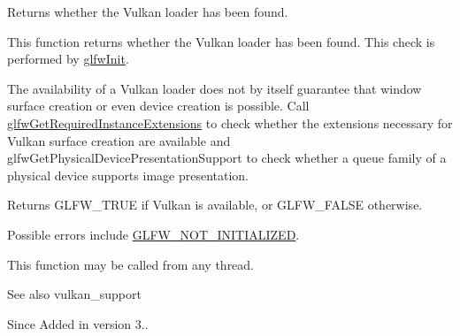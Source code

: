 Returns whether the Vulkan loader has been found. 

This function returns whether the Vulkan loader has been found. This check is performed by \hyperlink{group__init_gab41771f0215a2e0afb4cf1cf98082d40}{glfw\+Init}.

The availability of a Vulkan loader does not by itself guarantee that window surface creation or even device creation is possible. Call \hyperlink{group__vulkan_gada152edc5bbbd0c2138728878632fd9c}{glfw\+Get\+Required\+Instance\+Extensions} to check whether the extensions necessary for Vulkan surface creation are available and glfw\+Get\+Physical\+Device\+Presentation\+Support to check whether a queue family of a physical device supports image presentation.

\begin{DoxyReturn}{Returns}
{\ttfamily G\+L\+F\+W\+\_\+\+T\+R\+UE} if Vulkan is available, or {\ttfamily G\+L\+F\+W\+\_\+\+F\+A\+L\+SE} otherwise.
\end{DoxyReturn}
Possible errors include \hyperlink{group__errors_ga2374ee02c177f12e1fa76ff3ed15e14a}{G\+L\+F\+W\+\_\+\+N\+O\+T\+\_\+\+I\+N\+I\+T\+I\+A\+L\+I\+Z\+ED}.

This function may be called from any thread.

\begin{DoxySeeAlso}{See also}
vulkan\+\_\+support
\end{DoxySeeAlso}
\begin{DoxySince}{Since}
Added in version 3.. 
\end{DoxySince}
